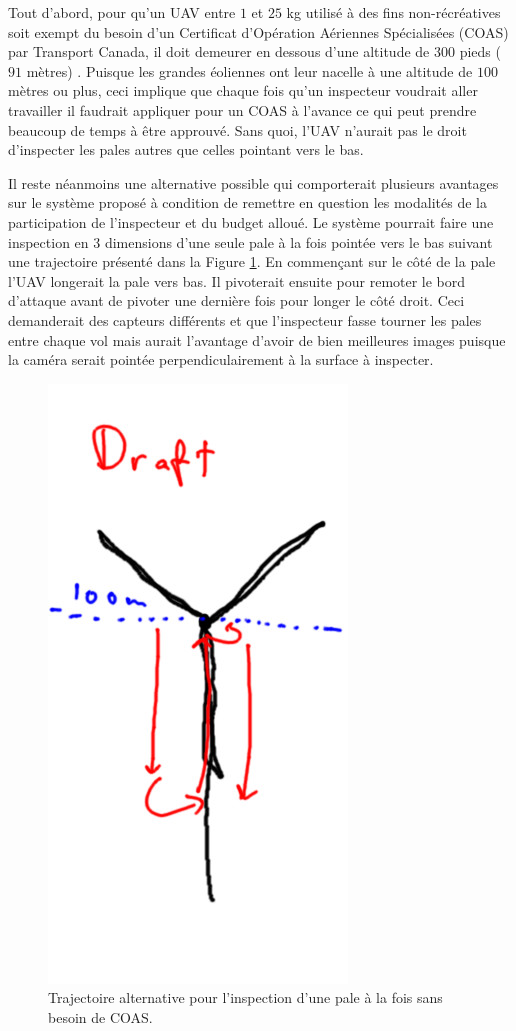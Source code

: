 Tout d'abord, pour qu'un UAV entre $1$ et $25$ kg utilisé à des fins non-récréatives soit exempt du besoin d'un Certificat d'Opération Aériennes Spécialisées (COAS) par Transport Canada, il doit demeurer en dessous d'une altitude de $300$ pieds ($91$ mètres) \citep{transportscanada2016}. Puisque les grandes éoliennes ont leur nacelle à une altitude de $100$ mètres ou plus, ceci implique que chaque fois qu'un inspecteur voudrait aller travailler il faudrait appliquer pour un COAS à l'avance ce qui peut prendre beaucoup de temps à être approuvé. Sans quoi, l'UAV n'aurait pas le droit d'inspecter les pales autres que celles pointant vers le bas.

Il reste néanmoins une alternative possible qui comporterait plusieurs avantages sur le système proposé à condition de remettre en question les modalités de la participation de l'inspecteur et du budget alloué. Le système pourrait faire une inspection en 3 dimensions d'une seule pale à la fois pointée vers le bas suivant une trajectoire présenté dans la Figure \ref{fig:alternative}. En commençant sur le côté de la pale l'UAV longerait la pale vers bas. Il pivoterait ensuite pour remoter le bord d'attaque avant de pivoter une dernière fois pour longer le côté droit. Ceci demanderait des capteurs différents et que l'inspecteur fasse tourner les pales entre chaque vol mais aurait l'avantage d'avoir de bien meilleures images puisque la caméra serait pointée perpendiculairement à la surface à inspecter.

\begin{figure}[htb]
  \centering
  \includegraphics[width=0.3\linewidth]{images/cool_alternative.jpg}
  \caption{Trajectoire alternative pour l'inspection d'une pale à la fois sans besoin de COAS.}
  \label{fig:alternative}
\end{figure}


